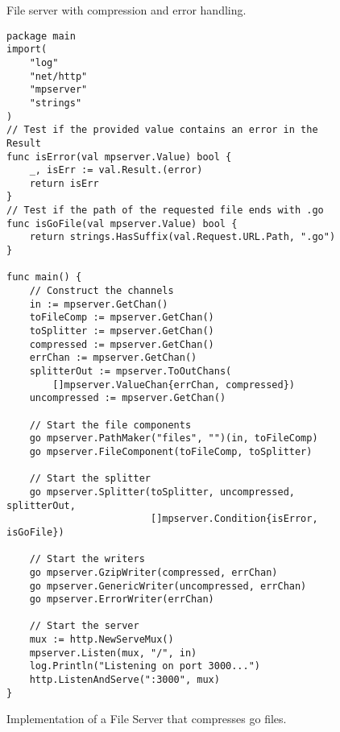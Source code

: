 \documentclass[12pt,a4paper]{article}
\begin{document}
\begin{figure}[h]
\centering
{}
\caption[scale=1.0]{File server with compression and error handling.}
\label{fig:fileServer3}
\end{figure}

\begin{figure}
\begin{lstlisting}
package main
import(
    "log"
    "net/http"
    "mpserver"
    "strings"
)
// Test if the provided value contains an error in the Result
func isError(val mpserver.Value) bool {
    _, isErr := val.Result.(error)
    return isErr
}
// Test if the path of the requested file ends with .go
func isGoFile(val mpserver.Value) bool {
    return strings.HasSuffix(val.Request.URL.Path, ".go")
}

func main() {
    // Construct the channels
    in := mpserver.GetChan()
    toFileComp := mpserver.GetChan()
    toSplitter := mpserver.GetChan()
    compressed := mpserver.GetChan()
    errChan := mpserver.GetChan()
    splitterOut := mpserver.ToOutChans(
        []mpserver.ValueChan{errChan, compressed})
    uncompressed := mpserver.GetChan()

    // Start the file components
    go mpserver.PathMaker("files", "")(in, toFileComp)
    go mpserver.FileComponent(toFileComp, toSplitter)
    
    // Start the splitter
    go mpserver.Splitter(toSplitter, uncompressed, splitterOut, 
                         []mpserver.Condition{isError, isGoFile})

    // Start the writers
    go mpserver.GzipWriter(compressed, errChan)
    go mpserver.GenericWriter(uncompressed, errChan)
    go mpserver.ErrorWriter(errChan)

    // Start the server
    mux := http.NewServeMux()
    mpserver.Listen(mux, "/", in)
    log.Println("Listening on port 3000...")
    http.ListenAndServe(":3000", mux)
}
\end{lstlisting}
\caption[scale=1.0]{Implementation of a File Server that compresses go files.}
\label{fig:FileServerImpl}
\end{figure}
\end{document}
